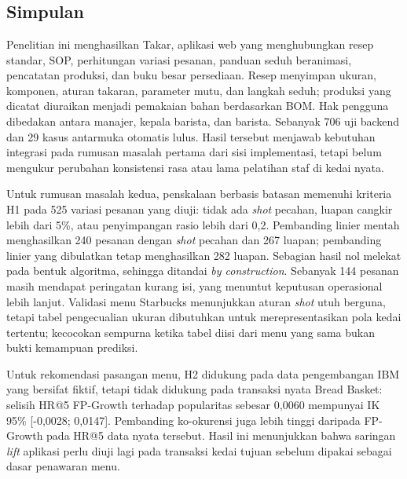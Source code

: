 \chapter{\babLima}
\label{bab:simpulan}

\section{Simpulan}
\label{sec:simpulan}

Penelitian ini menghasilkan Takar, aplikasi web yang menghubungkan resep standar, SOP, perhitungan variasi pesanan, panduan seduh beranimasi, pencatatan produksi, dan buku besar persediaan. Resep menyimpan ukuran, komponen, aturan takaran, parameter mutu, dan langkah seduh; produksi yang dicatat diuraikan menjadi pemakaian bahan berdasarkan BOM. Hak pengguna dibedakan antara manajer, kepala barista, dan barista. Sebanyak 706 uji backend dan 29 kasus antarmuka otomatis lulus. Hasil tersebut menjawab kebutuhan integrasi pada rumusan masalah pertama dari sisi implementasi, tetapi belum mengukur perubahan konsistensi rasa atau lama pelatihan staf di kedai nyata.

Untuk rumusan masalah kedua, penskalaan berbasis batasan memenuhi kriteria H1 pada 525 variasi pesanan yang diuji: tidak ada \textit{shot} pecahan, luapan cangkir lebih dari 5\%, atau penyimpangan rasio lebih dari 0,2. Pembanding linier mentah menghasilkan 240 pesanan dengan \textit{shot} pecahan dan 267 luapan; pembanding linier yang dibulatkan tetap menghasilkan 282 luapan. Sebagian hasil nol melekat pada bentuk algoritma, sehingga ditandai \textit{by construction}. Sebanyak 144 pesanan masih mendapat peringatan kurang isi, yang menuntut keputusan operasional lebih lanjut. Validasi menu Starbucks menunjukkan aturan \textit{shot} utuh berguna, tetapi tabel pengecualian ukuran dibutuhkan untuk merepresentasikan pola kedai tertentu; kecocokan sempurna ketika tabel diisi dari menu yang sama bukan bukti kemampuan prediksi.

Untuk rekomendasi pasangan menu, H2 didukung pada data pengembangan IBM yang bersifat fiktif, tetapi tidak didukung pada transaksi nyata Bread Basket: selisih HR@5 FP-Growth terhadap popularitas sebesar 0,0060 mempunyai IK 95\% [-0,0028; 0,0147]. Pembanding ko-okurensi juga lebih tinggi daripada FP-Growth pada HR@5 data nyata tersebut. Hasil ini menunjukkan bahwa saringan \textit{lift} aplikasi perlu diuji lagi pada transaksi kedai tujuan sebelum dipakai sebagai dasar penawaran menu.

